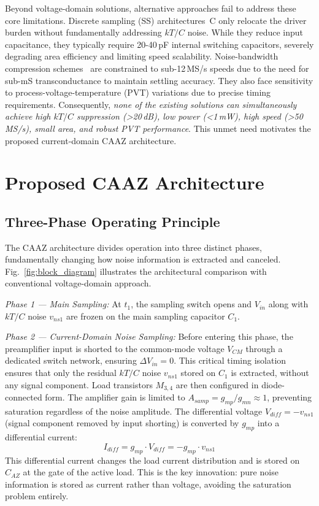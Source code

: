 \documentclass[journal]{IEEEtran}
\begin{document}
Beyond voltage-domain solutions, alternative approaches fail to address these core limitations. Discrete sampling (SS) architectures~\cite{huang2012kT}C only relocate the driver burden without fundamentally addressing $kT/C$ noise. While they reduce input capacitance, they typically require 20-40\,pF internal switching capacitors, severely degrading area efficiency and limiting speed scalability. Noise-bandwidth compression schemes~\cite{li2011noise} are constrained to sub-12\,MS/s speeds due to the need for sub-mS transconductance to maintain settling accuracy. They also face sensitivity to process-voltage-temperature (PVT) variations due to precise timing requirements. Consequently, \textit{none of the existing solutions can simultaneously achieve high $kT/C$ suppression (>20\,dB), low power (<1\,mW), high speed (>50\,MS/s), small area, and robust PVT performance}. This unmet need motivates the proposed current-domain CAAZ architecture.

\section{Proposed CAAZ Architecture}

\subsection{Three-Phase Operating Principle}
The CAAZ architecture divides operation into three distinct phases, fundamentally changing how noise information is extracted and canceled. Fig.~\ref{fig:block_diagram} illustrates the architectural comparison with conventional voltage-domain approach.

\textit{Phase 1 --- Main Sampling:} At $t_1$, the sampling switch opens and $V_{in}$ along with $kT/C$ noise $v_{ns1}$ are frozen on the main sampling capacitor $C_1$.

\textit{Phase 2 --- Current-Domain Noise Sampling:} Before entering this phase, the preamplifier input is shorted to the common-mode voltage $V_{CM}$ through a dedicated switch network, ensuring $\Delta V_{in} = 0$. This critical timing isolation ensures that only the residual $kT/C$ noise $v_{ns1}$ stored on $C_1$ is extracted, without any signal component. Load transistors $M_{3,4}$ are then configured in diode-connected form. The amplifier gain is limited to $A_{samp} = g_{mp}/g_{mn} \approx 1$, preventing saturation regardless of the noise amplitude. The differential voltage $V_{diff} = -v_{ns1}$ (signal component removed by input shorting) is converted by $g_{mp}$ into a differential current:
\begin{equation}
I_{diff} = g_{mp} \cdot V_{diff} = -g_{mp} \cdot v_{ns1}
\label{eq:current_conversion}
\end{equation}
This differential current changes the load current distribution and is stored on $C_{AZ}$ at the gate of the active load. This is the key innovation: pure noise information is stored as current rather than voltage, avoiding the saturation problem entirely.
\end{document}
